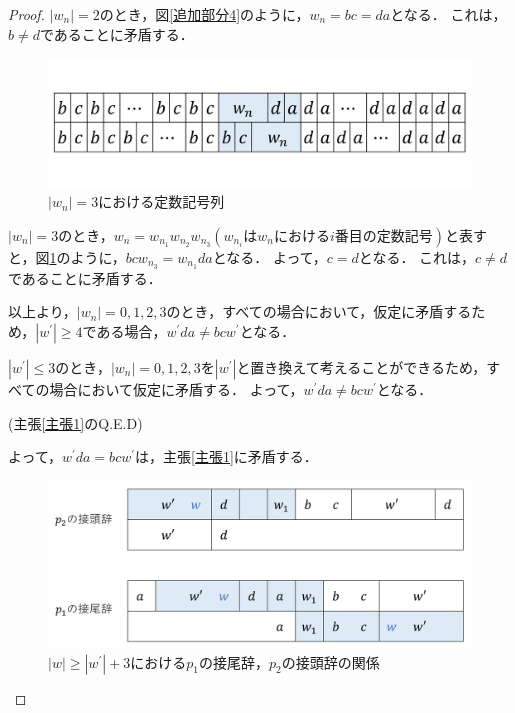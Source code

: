 \begin{proof}
$|w_{n}|=2$のとき，図\ref{追加部分4}のように，$w_{n}=bc=da$となる．
これは，$b \not = d$であることに矛盾する．

\begin{figure}  
\centering
\includegraphics[width=\linewidth]{画像/追加部分5.png}
\vspace{-1.5cm}
\caption{$|w_{n}| = 3$における定数記号列}
\label{追加部分5}
\end{figure}

$|w_{n}|=3$のとき，$w_{n}=w_{n_{1}}w_{n_{2}}w_{n_{3}} (w_{n_{i}}はw_{n}におけるi番目の定数記号)$と表すと，図\ref{追加部分5}のように，$bcw_{n_{3}}=w_{n_{1}}da$となる．
よって，$c=d$となる．
これは，$c \not = d$であることに矛盾する．

以上より，$|w_{n}|=0,1,2,3$のとき，すべての場合において，仮定に矛盾するため，$|w^{\prime}| \ge 4$である場合，$w^{\prime}da \not = bcw^{\prime}$となる．

$|w^{\prime}| \le 3$のとき，$|w_{n}|=0,1,2,3$を$|w^{\prime}|$と置き換えて考えることができるため，すべての場合において仮定に矛盾する．
よって，$w^{\prime}da \not = bcw^{\prime}$となる．

\hspace{\fill}\rm{(主張\ref{主張1}のQ.E.D)}

よって，$w^{\prime}da=bcw^{\prime}$は，主張\ref{主張1}に矛盾する．

\begin{figure}  
\centering
\includegraphics[width=\linewidth]{画像/追加部分6.png}
\vspace{-1cm}
\caption{$|w| \ge |w^{\prime}|+3$における$p_{1}$の接尾辞，$p_{2}$の接頭辞の関係}
\label{追加部分6}
\end{figure}


\end{proof}
